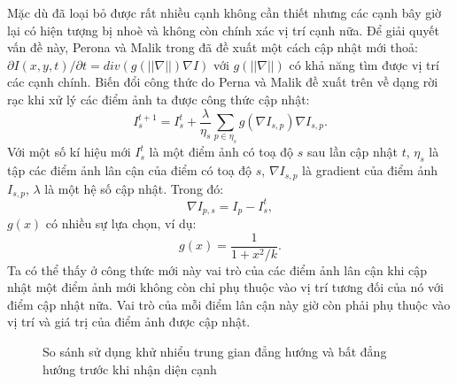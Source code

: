 Mặc dù đã loại bỏ được rất nhiều cạnh không cần thiết nhưng các cạnh bây giờ lại có hiện tượng bị nhoè và không còn chính xác vị trí cạnh nữa. Để giải quyết vấn đề này, Perona và Malik trong \cite{56205} đã đề xuất một cách cập nhật mới thoả: $\partial I(x,y,t)/\partial t = div(g(||\nabla||) \nabla I)$ với $g(||\nabla||)$ có khả năng tìm được vị trí các cạnh chính. Biến đổi công thức do Perna và Malik đề xuất trên về dạng rời rạc khi xử lý các điểm ảnh ta được công thức cập nhật:
$$I^{t+1}_{s} = I^{t}_{s} + \frac{\lambda }{\eta_{s}}\sum_{p \in \eta_{s}}g(\nabla I_{s,p})\nabla I_{s,p}.$$
Với một số kí hiệu mới $I^{t}_{s}$ là một điểm ảnh có toạ độ $s$ sau lần cập nhật $t$, $\eta_{s}$ là tập các điểm ảnh lân cận của điểm có toạ độ $s$, $\nabla I_{s,p}$ là gradient của điểm ảnh $I_{s,p}$, $\lambda$ là một hệ số cập nhật. Trong đó:
$$\nabla I_{p,s} = I_{p} - I_{s}^{t},$$
$g(x)$ có nhiều sự lựa chọn, ví dụ:
$$g(x) = \frac{1}{1 + {x^{2}/k}}.$$
Ta có thể thấy ở công thức mới này vai trò của các điểm ảnh lân cận khi cập nhật một điểm ảnh mới không còn chỉ phụ thuộc vào vị trí tương đối của nó với điểm cập nhật nữa. Vai trò của mỗi điểm lân cận này giờ còn phải phụ thuộc vào vị trí và giá trị của điểm ảnh được cập nhật.


\begin{figure}
  \centering
  \caption{So sánh sử dụng khử nhiểu trung gian đẳng hướng và bất đẳng hướng trước khi nhận diện cạnh}
  \label{fig:iso_aniso}
\end{figure}

